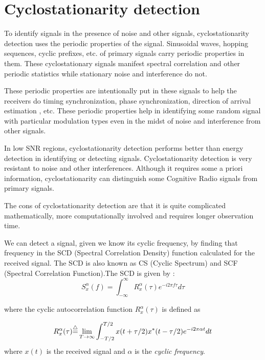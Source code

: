 \section{Cyclostationarity detection}

To identify signals in the presence of noise and other signals, 
cyclostationarity detection uses the periodic properties of the signal. 
Sinusoidal waves, hopping sequences, cyclic prefixes, etc. of primary signals
carry periodic properties in them. These cyclostationary signals manifest 
spectral correlation and other periodic statistics while stationary noise and
interference do not.

These periodic properties are intentionally put in these signals to help the
receivers do timing synchronization, phase synchronization,
direction of arrival estimation \cite{kranthi13}, etc. These periodic 
properties help in identifying some random signal with particular modulation
types even in the midst of noise and interference from other signals.

In low SNR regions, cyclostationarity detection performs better than energy 
detection in identifying or detecting signals. Cyclostationarity detection is
very resistant to noise and other interferences. Although it requires some
a priori information, cyclostationarity can distinguish some Cognitive Radio
signals from primary signals.

The cons of cyclostationarity detection are that it is quite complicated 
mathematically, more computationally involved and requires longer observation
time.

We can detect a signal, given we know its cyclic frequency, by finding that
frequency in the SCD (Spectral Correlation Density) function calculated for 
the received signal. The SCD is also known as CS (Cyclic Spectrum) and SCF 
(Spectral Correlation Function).The SCD is given by \cite{deepa10}:
\begin{equation*}
    S_{x}^{\alpha}(f) = \int_{-\infty}^{\infty}R_{x}^{\alpha}(\tau)e^{-i2\pi 
    f\tau}d\tau
\end{equation*}

where the cyclic autocorrelation function $R_{x}^{\alpha}(\tau)$ is defined as
\cite{gardner91}

\begin{equation*}
    R_{x}^{\alpha}(\tau) {\buildrel\triangle\over =} \lim_{T\rightarrow\infty}
    \int_{-T/2}^{T/2}x(t+\tau/2)x^{\ast}(t-\tau/2)e^{-{i2\pi\alpha t}}dt
\end{equation*}
where $x(t)$ is the received signal and $\alpha$ is the 
\emph{cyclic frequency}.

